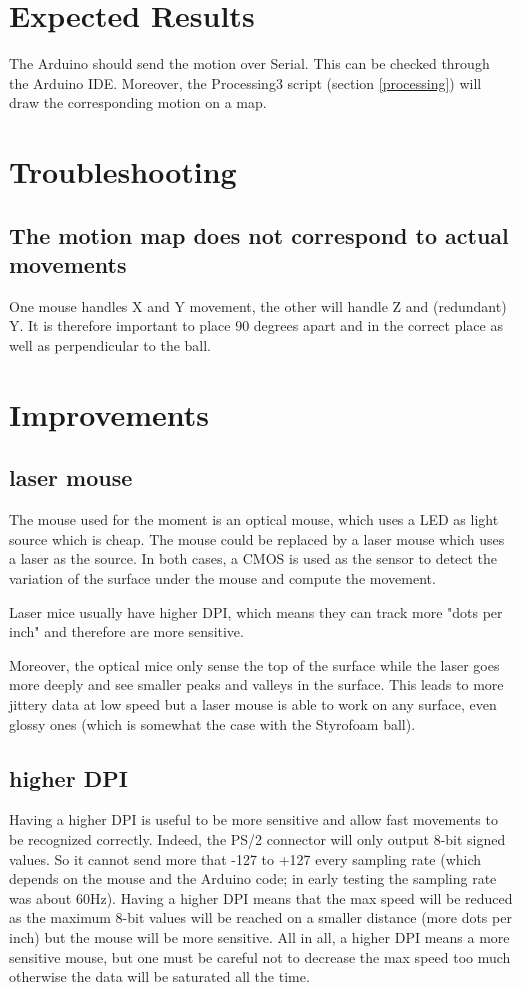 \documentclass[a4paper]{article}
\begin{document}
\section{Expected Results}
The Arduino should send the motion over Serial. This can be checked through the Arduino IDE. Moreover, the Processing3 script (section \ref{processing}) will draw the corresponding motion on a map.

\section{Troubleshooting}
\subsection{The motion map does not correspond to actual movements}
One mouse handles X and Y movement, the other will handle Z and (redundant) Y. It is therefore important to place 90 degrees apart and in the correct place as well as perpendicular to the ball.
\section{Improvements}
\subsection{laser mouse}
The mouse used for the moment is an optical mouse, which uses a LED as light source which is cheap. The mouse could be replaced by a laser mouse which uses a laser as the source.
In both cases, a CMOS is used as the sensor to detect the variation of the surface under the mouse and compute the movement.

Laser mice usually have higher DPI, which means they can track more "dots per inch" and therefore are more sensitive.

Moreover, the optical mice only sense the top of the surface while the laser goes more deeply and see smaller peaks and valleys in the surface. This leads to more jittery data at low speed but a laser mouse is able to work on any surface, even glossy ones (which is somewhat the case with the Styrofoam ball).

\subsection{higher DPI}
Having a higher DPI is useful to be more sensitive and allow fast movements to be recognized correctly. Indeed, the PS/2 connector will only output 8-bit signed values. So it cannot send more that -127 to +127 every sampling rate (which depends on the mouse and the Arduino code; in early testing the sampling rate was about 60Hz). 
Having a higher DPI means that the max speed will be reduced as the maximum 8-bit values will be reached on a smaller distance (more dots per inch) but the mouse will be more sensitive.
All in all, a higher DPI means a more sensitive mouse, but one must be careful not to decrease the max speed too much otherwise the data will be saturated all the time.
\end{document}
